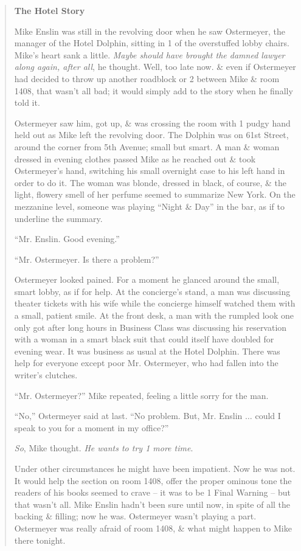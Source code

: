 \documentclass{article}
\numberwithin{equation}{section}
\begin{document}
\begin{quotation}
	\begin{center}
		\textbf{\textsf{The Hotel Story}}
	\end{center}
	Mike Enslin was still in the revolving door when he saw Ostermeyer, the manager of the Hotel Dolphin, sitting in 1 of the overstuffed lobby chairs. Mike's heart sank a little. \textit{Maybe should have brought the damned lawyer along again, after all}, he thought. Well, too late now. \& even if Ostermeyer had decided to throw up another roadblock or 2 between Mike \& room 1408, that wasn't all bad; it would simply add to the story when he finally told it.
	
	Ostermeyer saw him, got up, \& was crossing the room with 1 pudgy hand held out as Mike left the revolving door. The Dolphin was on 61st Street, around the corner from 5th Avenue; small but smart. A man \& woman dressed in evening clothes passed Mike as he reached out \& took Ostermeyer's hand, switching his small overnight case to his left hand in order to do it. The woman was blonde, dressed in black, of course, \& the light, flowery smell of her perfume seemed to summarize New York. On the mezzanine level, someone was playing ``Night \& Day'' in the bar, as if to underline the summary.
	
	``Mr. Enslin. Good evening.''
	
	``Mr. Ostermeyer. Is there a problem?''
	
	Ostermeyer looked pained. For a moment he glanced around the small, smart lobby, as if for help. At the concierge's stand, a man was discussing theater tickets with his wife while the concierge himself watched them with a small, patient smile. At the front desk, a man with the rumpled look one only got after long hours in Business Class was discussing his reservation with a woman in a smart black suit that could itself have doubled for evening wear. It was business as usual at the Hotel Dolphin. There was help for everyone except poor Mr. Ostermeyer, who had fallen into the writer's clutches.
	
	``Mr. Ostermeyer?'' Mike repeated, feeling a little sorry for the man.
	
	``No,'' Ostermeyer said at last. ``No problem. But, Mr. Enslin $\ldots$ could I speak to you for a moment in my office?''
	
	\textit{So}, Mike thought. \textit{He wants to try 1 more time}.
	
	Under other circumstances he might have been impatient. Now he was not. It would help the section on room 1408, offer the proper ominous tone the readers of his books seemed to crave -- it was to be 1 Final Warning -- but that wasn't all. Mike Enslin hadn't been sure until now, in spite of all the backing \& filling; now he was. Ostermeyer wasn't playing a part. Ostermeyer was really afraid of room 1408, \& what might happen to Mike there tonight.
	

\end{quotation}
\end{document}
